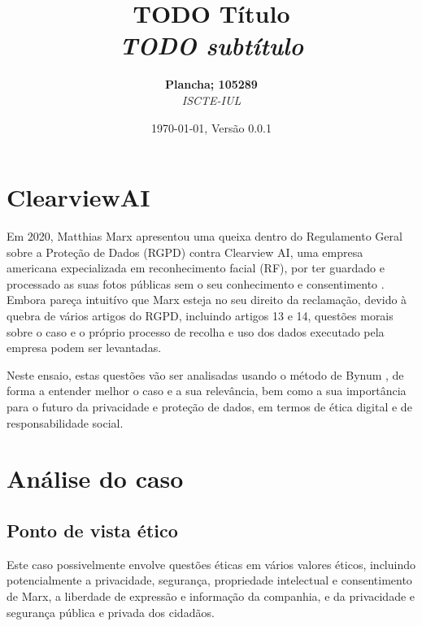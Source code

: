 \documentclass[12pt]{../diazessay}
\title{\textbf{TODO Título} \\ {\Large\itshape TODO subtítulo}}
\author{\textbf{Plancha; 105289} \\ \textit{ISCTE-IUL}}
\date{\today , Versão 0.0.1}
\begin{document}
\maketitle

\section*{ClearviewAI}
Em 2020, Matthias Marx apresentou uma queixa dentro do Regulamento Geral sobre a Proteção de Dados (RGPD) contra Clearview AI, uma empresa americana expecializada em reconhecimento facial (RF), por ter guardado e processado as suas fotos públicas sem o seu conhecimento e consentimento \parencite{wired}. Embora pareça intuitívo que Marx esteja no seu direito da reclamação, devido à quebra de vários artigos do RGPD, incluindo artigos 13 e 14, questões morais sobre o caso e o próprio processo de recolha e uso dos dados executado pela empresa podem ser levantadas.

Neste ensaio, estas questões vão ser analisadas usando o método de Bynum \parencite{Bynum}, de forma a entender melhor o caso e a sua relevância, bem como a sua importância para o futuro da privacidade e proteção de dados, em termos de ética digital e de responsabilidade social.

\section*{Análise do caso}
\subsection*{Ponto de vista ético}
Este caso possivelmente envolve questões éticas em vários valores éticos, incluindo potencialmente a privacidade, segurança, propriedade intelectual e consentimento de Marx, a liberdade de expressão e informação da companhia, e da privacidade e segurança pública e privada dos cidadãos.
\end{document}
